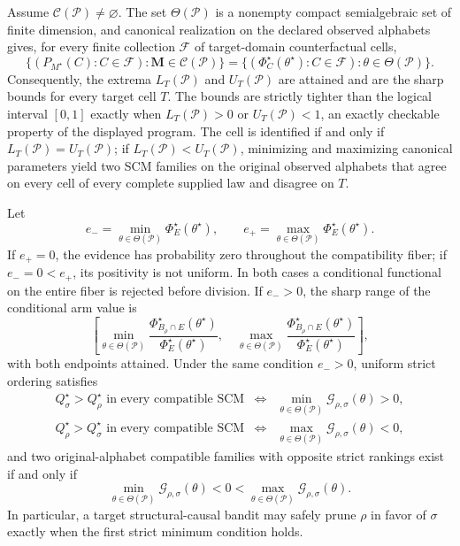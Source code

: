 Assume \(\mathcal C(\mathcal P)\ne\varnothing\).  The set \(\Theta(\mathcal P)\) is a nonempty compact semialgebraic set of finite dimension, and canonical realization on the declared observed alphabets gives, for every finite collection \(\mathcal F\) of target-domain counterfactual cells,
\[
 \bigl\{(P_{M^\star}(C):C\in\mathcal F):
       \mathbf M\in\mathcal C(\mathcal P)\bigr\}
 =
 \bigl\{(\Phi_C^\star(\theta^\star):C\in\mathcal F):
       \theta\in\Theta(\mathcal P)\bigr\}.
\]
Consequently, the extrema \(L_T(\mathcal P)\) and \(U_T(\mathcal P)\) are attained and are the sharp bounds for every target cell \(T\).  The bounds are strictly tighter than the logical interval \([0,1]\) exactly when \(L_T(\mathcal P)>0\) or \(U_T(\mathcal P)<1\), an exactly checkable property of the displayed program.  The cell is identified if and only if \(L_T(\mathcal P)=U_T(\mathcal P)\); if \(L_T(\mathcal P)<U_T(\mathcal P)\), minimizing and maximizing canonical parameters yield two SCM families on the original observed alphabets that agree on every cell of every complete supplied law and disagree on \(T\).

Let
\[
 e_-=\min_{\theta\in\Theta(\mathcal P)}\Phi_E^\star(\theta^\star),
 \qquad
 e_+=\max_{\theta\in\Theta(\mathcal P)}\Phi_E^\star(\theta^\star).
\]
If \(e_+ =0\), the evidence has probability zero throughout the compatibility fiber; if \(e_-=0<e_+\), its positivity is not uniform.  In both cases a conditional functional on the entire fiber is rejected before division.  If \(e_->0\), the sharp range of the conditional arm value is
\[
 \left[
 \min_{\theta\in\Theta(\mathcal P)}
 \frac{\Phi_{B_\rho\cap E}^\star(\theta^\star)}
      {\Phi_E^\star(\theta^\star)},
 \quad
 \max_{\theta\in\Theta(\mathcal P)}
 \frac{\Phi_{B_\rho\cap E}^\star(\theta^\star)}
      {\Phi_E^\star(\theta^\star)}
 \right],
\]
with both endpoints attained.  Under the same condition \(e_->0\), uniform strict ordering satisfies
\[
 \begin{array}{rcl}
 Q_\sigma^\star>Q_\rho^\star\text{ in every compatible SCM}
 &\Longleftrightarrow&
 \displaystyle\min_{\theta\in\Theta(\mathcal P)}
 \mathcal G_{\rho,\sigma}(\theta)>0,\\[3pt]
 Q_\rho^\star>Q_\sigma^\star\text{ in every compatible SCM}
 &\Longleftrightarrow&
 \displaystyle\max_{\theta\in\Theta(\mathcal P)}
 \mathcal G_{\rho,\sigma}(\theta)<0,
 \end{array}
\]
and two original-alphabet compatible families with opposite strict rankings exist if and only if
\[
 \min_{\theta\in\Theta(\mathcal P)}\mathcal G_{\rho,\sigma}(\theta)<0
 <\max_{\theta\in\Theta(\mathcal P)}\mathcal G_{\rho,\sigma}(\theta).
\]
In particular, a target structural-causal bandit may safely prune \(\rho\) in favor of \(\sigma\) exactly when the first strict minimum condition holds.

